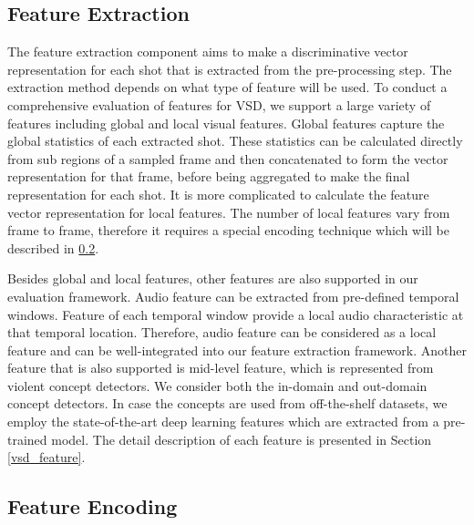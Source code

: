 \documentclass[review]{elsarticle}
\begin{document}
\subsection{Feature Extraction}
The feature extraction component aims to make a discriminative vector representation for each shot that is extracted from the pre-processing step. The extraction method depends on what type of feature will be used. To conduct a comprehensive evaluation of features for VSD, we support a large variety of features including global and local visual features. Global features capture the global statistics of each extracted shot. These statistics can be calculated directly from sub regions of a sampled frame and then concatenated to form the vector representation for that frame, before being aggregated to make the final representation for each shot. It is more complicated to calculate the feature vector representation for local features. The number of local features vary from frame to frame, therefore it requires a special encoding technique which will be described in \ref{feature_encoding}.

Besides global and local features, other features are also supported in our evaluation framework. Audio feature can be extracted from pre-defined temporal windows. Feature of each temporal window provide a local audio characteristic at that temporal location. Therefore, audio feature can be considered as a local feature and can be well-integrated into our feature extraction framework. Another feature that is also supported is mid-level feature, which is represented from violent concept detectors. We consider both the in-domain and out-domain concept detectors. In case the concepts are used from off-the-shelf datasets, we employ the state-of-the-art deep learning features which are extracted from a pre-trained model. The detail description of each feature is presented in Section \ref{vsd_feature}.

\subsection{Feature Encoding}
\label{feature_encoding}

\end{document}
